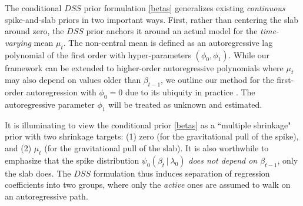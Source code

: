 \documentclass[ba]{imsart}
\numberwithin{equation}{section}
\theoremstyle{plain}
\def\C {\,|\:}
\def\C {\,|\:}
\begin{document}
The conditional $DSS$ prior formulation \eqref{betas} generalizes existing {\sl continuous} spike-and-slab priors \citep{GM93,ishrawan_rao_annals,rockova15} in two important ways. First, rather than centering the slab around zero, the $DSS$ prior anchors it around an actual model for the {\sl time-varying} mean  $\mu_t$. The non-central mean is defined as an autoregressive lag polynomial of the first order with  hyper-parameters $(\phi_0,\phi_1)$. While our framework can be extended to higher-order autoregressive polynomials where $\mu_t$ may also depend on values older than $\beta_{t-1}$, we outline our method for the first-order autoregression with $\phi_0=0$ due to its ubiquity  in practice \citep{fused_lasso,WestHarrison1997book2,Prado2010}. {The autoregressive parameter $\phi_1$ will be treated as unknown and estimated.}

It is illuminating to view the conditional prior \eqref{betas}  as a ``multiple shrinkage" prior \citep{george86a,george86b} with two shrinkage targets: (1) zero (for the gravitational pull of the spike), and (2) $\mu_{t}$ (for the gravitational pull of  the slab). It is also worthwhile to emphasize that the spike distribution $\psi_0(\beta_{t}\C\lambda_0)$ {\sl does not depend on $\beta_{t-1}$}, only the slab does.  The $DSS$ formulation thus  induces separation of regression coefficients  into two groups, where only the {\sl active} ones are assumed to walk on an autoregressive path.  
\end{document}
